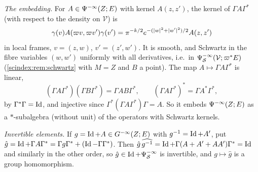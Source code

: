 \emph{The embedding.} For $A\in\Psi^{-\infty}(Z;E)$ with kernel $A(z,z')$, the
kernel of $\Gamma A\Gamma^*$ (with respect to the density on $\mathcal V$) is
\begin{equation*}
  \gamma(v)A(\varpi v,\varpi v')\gamma(v')=\pi^{-k/2}e^{-(\lvert w\rvert^2+\lvert w'\rvert^2)/2}A(z,z')
\end{equation*}
in local frames, $v=(z,w)$, $v'=(z',w')$. It is smooth, and Schwartz in the fibre
variables $(w,w')$ uniformly with all derivatives, i.e.\ in
$\Psi^{-\infty}_{\mathcal S}(\mathcal V;\varpi^*E)$ (\cref{scindex:rem:schwartz}
with $M=Z$ and $B$ a point). The map $A\mapsto\Gamma A\Gamma^*$ is linear,
\begin{equation*}
  (\Gamma A\Gamma^*)(\Gamma B\Gamma^*)=\Gamma AB\Gamma^*,\qquad
  (\Gamma A\Gamma^*)^*=\Gamma A^*\Gamma^*,
\end{equation*}
by $\Gamma^*\Gamma=\operatorname{Id}$, and injective since $\Gamma^*(\Gamma A\Gamma^*)\Gamma=A$.
So it embeds $\Psi^{-\infty}(Z;E)$ as a $*$-subalgebra (without unit) of the
operators with Schwartz kernels.

\emph{Invertible elements.} If $g=\operatorname{Id}+A\in G^{-\infty}(Z;E)$ with $g^{-1}=\operatorname{Id}+A'$, put
$\hat g=\operatorname{Id}+\Gamma A\Gamma^*=\Gamma g\Gamma^*+(\operatorname{Id}-\Gamma\Gamma^*)$. Then
$\hat g\,\widehat{g^{-1}}=\operatorname{Id}+\Gamma(A+A'+AA')\Gamma^*=\operatorname{Id}$ and similarly in the
other order, so $\hat g\in\operatorname{Id}+\Psi^{-\infty}_{\mathcal S}$ is invertible, and
$g\mapsto\hat g$ is a group homomorphism.

